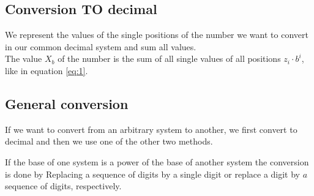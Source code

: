 \subsection{Conversion TO decimal}
We represent the values of the single positions of the number we want to convert in our common decimal system and sum all values.\\
The value $X_b$ of the number is the sum of all single values of all positions $z_i\cdot b^i$, like in equation \eqref{eq:1}.

\subsection{General conversion}
If we want to convert from an arbitrary system to another, we first convert to decimal and then we use one of the other two methods.

\begin{observation}
	If the base of one system is a power of the base of another system the conversion is done by Replacing a sequence of digits by a single digit or replace a digit by $a$ sequence of digits, respectively.
\end{observation}